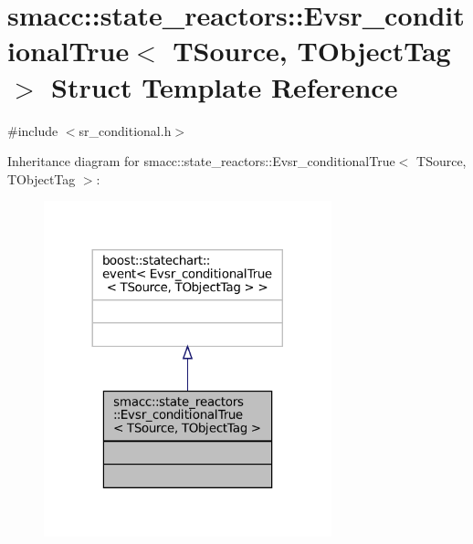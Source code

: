 \hypertarget{structsmacc_1_1state__reactors_1_1Evsr__conditionalTrue}{}\section{smacc\+:\+:state\+\_\+reactors\+:\+:Evsr\+\_\+conditional\+True$<$ T\+Source, T\+Object\+Tag $>$ Struct Template Reference}
\label{structsmacc_1_1state__reactors_1_1Evsr__conditionalTrue}


{\ttfamily \#include $<$sr\+\_\+conditional.\+h$>$}



Inheritance diagram for smacc\+:\+:state\+\_\+reactors\+:\+:Evsr\+\_\+conditional\+True$<$ T\+Source, T\+Object\+Tag $>$\+:
\nopagebreak
\begin{figure}[H]
\begin{center}
\leavevmode
\includegraphics[width=236pt]{structsmacc_1_1state__reactors_1_1Evsr__conditionalTrue__inherit__graph}
\end{center}
\end{figure}


